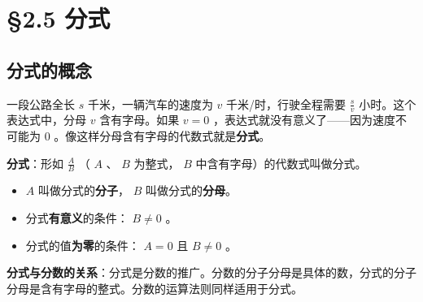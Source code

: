 \chapter{§2.5 分式}
\label{sec:2.5}





\section*{分式的概念}


\begin{explore}


一段公路全长 $s$ 千米，一辆汽车的速度为 $v$ 千米/时，行驶全程需要 $\frac{s}{v}$ 小时。这个表达式中，分母 $v$ 含有字母。如果 $v = 0$ ，表达式就没有意义了——因为速度不可能为 $0$ 。像这样分母含有字母的代数式就是\textbf{分式}。

\end{explore}

\begin{understand}


\textbf{分式}：形如 $\frac{A}{B}$ （ $A$ 、 $B$ 为整式， $B$ 中含有字母）的代数式叫做分式。

\begin{itemize}
  \item $A$ 叫做分式的\textbf{分子}， $B$ 叫做分式的\textbf{分母}。
  \item 分式\textbf{有意义}的条件： $B \neq 0$ 。
  \item 分式的值\textbf{为零}的条件： $A = 0$ 且 $B \neq 0$ 。
\end{itemize}


\textbf{分式与分数的关系}：分式是分数的推广。分数的分子分母是具体的数，分式的分子分母是含有字母的整式。分数的运算法则同样适用于分式。

\end{understand}

